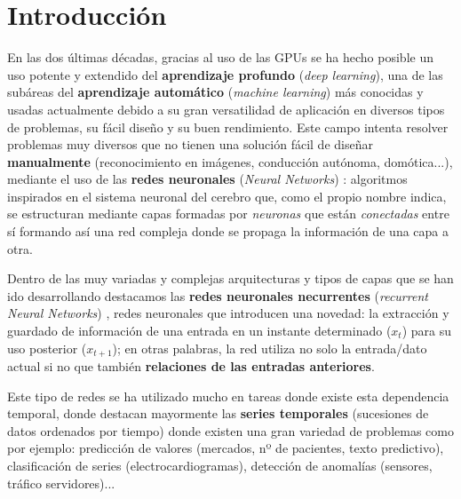 %


\chapter{Introducción}\label{ch:introduccion}

En las dos últimas décadas, gracias al uso de las GPUs \cite{oh2004gpu} se ha hecho posible un uso potente y extendido del \textbf{aprendizaje profundo} (\textit{deep learning}), una de las subáreas del \textbf{aprendizaje automático} (\emph{machine learning}) más conocidas y usadas actualmente debido a su gran versatilidad de aplicación en diversos tipos de problemas, su fácil diseño y su buen rendimiento. Este campo intenta resolver problemas muy diversos que no tienen una solución fácil de diseñar \textbf{manualmente} (reconocimiento en imágenes, conducción autónoma, domótica...), mediante el uso de las \textbf{redes neuronales} (\emph{Neural Networks}) \cite{landahl1943statistical, hebb1949organization}: algoritmos inspirados en el sistema neuronal del cerebro que, como el propio nombre indica, se estructuran mediante capas formadas por \emph{neuronas} que están \emph{conectadas} entre sí formando así una red compleja donde se propaga la información de una capa a otra.

Dentro de las muy variadas y complejas arquitecturas y tipos de capas que se han ido desarrollando destacamos las \textbf{redes neuronales necurrentes} (\emph{recurrent Neural Networks}) \cite{hopfield1982neural, jordan1997serial}, redes neuronales que introducen una novedad: la extracción y guardado de información de una entrada en un instante determinado ($x_t$) para su uso posterior ($x_{t+1}$); en otras palabras, la red utiliza no solo la entrada/dato actual si no que también \textbf{relaciones de las entradas anteriores}.

Este tipo de redes se ha utilizado mucho en tareas donde existe esta dependencia temporal, donde destacan mayormente las \textbf{series temporales} (sucesiones de datos ordenados por tiempo) \cite{wang2017origin} donde existen una gran variedad de problemas como por ejemplo: predicción de valores (mercados, nº de pacientes, texto predictivo), clasificación de series (electrocardiogramas), detección de anomalías (sensores, tráfico servidores)...

